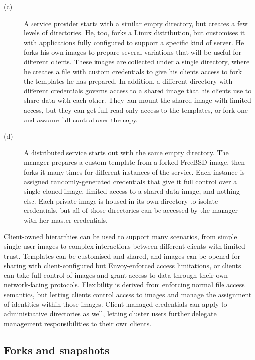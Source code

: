 \begin{description}
\item[(c)] A service provider starts with a similar empty directory, but creates a few levels of directories. He, too, forks a Linux distribution, but customises it with applications fully configured to support a specific kind of server. He forks his own images to prepare several variations that will be useful for different clients. These images are collected under a single directory, where he creates a file with custom credentials to give his clients access to fork the templates he has prepared. In addition, a different directory with different credentials governs access to a shared image that his clients use to share data with each other. They can mount the shared image with limited access, but they can get full read-only access to the templates, or fork one and assume full control over the copy.

\item[(d)] A distributed service starts out with the same empty directory. The manager prepares a custom template from a forked FreeBSD image, then forks it many times for different instances of the service. Each instance is assigned randomly-generated credentials that give it full control over a single cloned image, limited access to a shared data image, and nothing else. Each private image is housed in its own directory to isolate credentials, but all of those directories can be accessed by the manager with her master credentials.

\end{description}

Client-owned hierarchies can be used to support many scenarios, from simple single-user images to complex interactions between different clients with limited trust. Templates can be customised and shared, and images can be opened for sharing with client-configured but Envoy-enforced access limitations, or clients can take full control of images and grant access to data through their own network-facing protocols. Flexibility is derived from enforcing normal file access semantics, but letting clients control access to images and manage the assignment of identities within those images. Client-managed credentials can apply to administrative directories as well, letting cluster users further delegate management responsibilities to their own clients.

\subsection{Forks and snapshots}\label{sec:snapshots}

